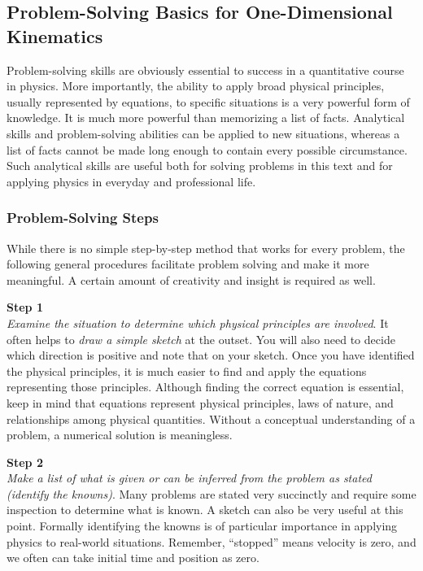 \documentclass[dvipsnames]{article}
\begin{document}
\subsection{Problem-Solving Basics for One-Dimensional Kinematics}

Problem-solving skills are obviously essential to success in a quantitative course in physics. More importantly, the ability to apply broad physical principles, usually represented by equations, to specific situations is a very powerful form of knowledge. It is much more powerful than memorizing a list of facts. Analytical skills and problem-solving abilities can be applied to new situations, whereas a list of facts cannot be made long enough to contain every possible circumstance. Such analytical skills are useful both for solving problems in this text and for applying physics in everyday and professional life.

\subsubsection*{Problem-Solving Steps}

While there is no simple step-by-step method that works for every problem, the following general procedures facilitate problem solving and make it more meaningful. A certain amount of creativity and insight is required as well.

\vspace{1em}

\textbf{Step 1}\\
\textit{Examine the situation to determine which physical principles are involved}. It often helps to \textit{draw a simple sketch} at the outset. You will also need to decide which direction is positive and note that on your sketch. Once you have identified the physical principles, it is much easier to find and apply the equations representing those principles. Although finding the correct equation is essential, keep in mind that equations represent physical principles, laws of nature, and relationships among physical quantities. Without a conceptual understanding of a problem, a numerical solution is meaningless.

\vspace{1em}

\textbf{Step 2}\\
\textit{Make a list of what is given or can be inferred from the problem as stated (identify the knowns)}. Many problems are stated very succinctly and require some inspection to determine what is known. A sketch can also be very useful at this point. Formally identifying the knowns is of particular importance in applying physics to real-world situations. Remember, ``stopped'' means velocity is zero, and we often can take initial time and position as zero.
\end{document}
